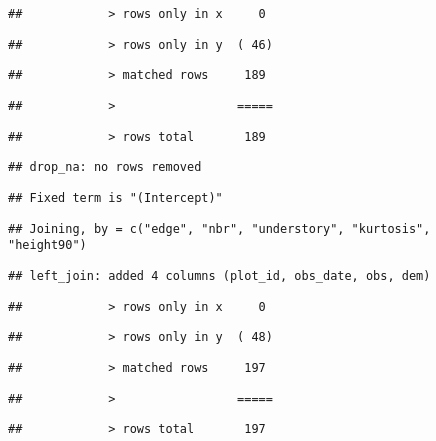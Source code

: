 \documentclass[
]{article}
\begin{document}
\begin{verbatim}
##            > rows only in x     0
\end{verbatim}

\begin{verbatim}
##            > rows only in y  ( 46)
\end{verbatim}

\begin{verbatim}
##            > matched rows     189
\end{verbatim}

\begin{verbatim}
##            >                 =====
\end{verbatim}

\begin{verbatim}
##            > rows total       189
\end{verbatim}

\begin{verbatim}
## drop_na: no rows removed
\end{verbatim}

\begin{verbatim}
## Fixed term is "(Intercept)"
\end{verbatim}

\begin{verbatim}
## Joining, by = c("edge", "nbr", "understory", "kurtosis", "height90")
\end{verbatim}

\begin{verbatim}
## left_join: added 4 columns (plot_id, obs_date, obs, dem)
\end{verbatim}

\begin{verbatim}
##            > rows only in x     0
\end{verbatim}

\begin{verbatim}
##            > rows only in y  ( 48)
\end{verbatim}

\begin{verbatim}
##            > matched rows     197
\end{verbatim}

\begin{verbatim}
##            >                 =====
\end{verbatim}

\begin{verbatim}
##            > rows total       197
\end{verbatim}
\end{document}
